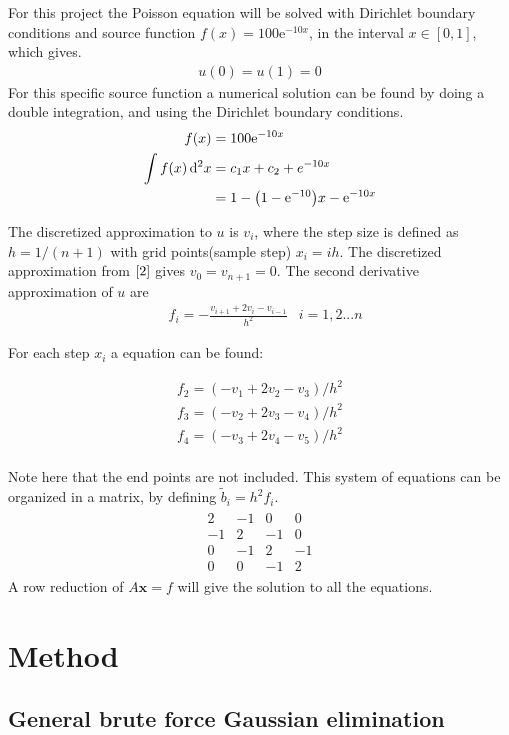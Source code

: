 \documentclass[12pt,norsk,a4paper]{article}
\renewcommand{\exp}[1]{\mathrm{e}^{#1}}
\begin{document}
For this project the Poisson equation will be solved with Dirichlet boundary conditions and source function $f(x)=100\exp{-10x}$, in the interval $x\in[0,1]$, which gives.
\begin{align}
	u(0)=u(1)=0
\end{align}\label{2}
For this specific source function a numerical solution can be found by doing a double integration, and using the Dirichlet boundary conditions. 
\begin{align*}
	f(x)&=100\exp{-10x}\\
	\int f(x)\dd[2]{x}&=c_1x+c_2 + e^{-10 x}\\
	&=1-\qty(1-\exp{-10})x-\exp{-10x}
\end{align*}

The discretized approximation to $u$ is $v_i$, where the step size is defined as $h=1/(n+1)$ with grid points(sample step) $x_i=ih$. The discretized approximation from $\ref{2}$ gives $v_0=v_{n+1}=0$. The second derivative approximation of $u$ are
\begin{align*}
	&f_i=-\frac{v_{i+1}+2v_{i}-{v_{i-1}}}{h^2}&i=1,2...n
\end{align*} 

For each step $x_i$ a equation can be found:

\begin{align*}
	f_2=(-v_{1}+2v_{2}-v_{3})/h^2\\
	f_3=(-v_{2}+2v_{3}-v_{4})/h^2\\
	f_4=(-v_{3}+2v_{4}-v_{5})/h^2\\
\end{align*}

Note here that the end points are not included. This system of equations can be organized in a matrix, by defining $\tilde{b}_i=h^2f_i$.
\begin{align*}
	\begin{array}{cccc}
	2 & -1 & 0 & 0 \\ 
	-1 & 2 & -1 & 0 \\ 
	0 & -1 & 2 & -1 \\ 
	0 & 0 & -1 & 2
	\end{array}
\end{align*}
 A row reduction of $A\mathbf{x}=f$ will give the solution to all the equations.


\section{Method}

\subsection*{General brute force Gaussian elimination}
\end{document}
